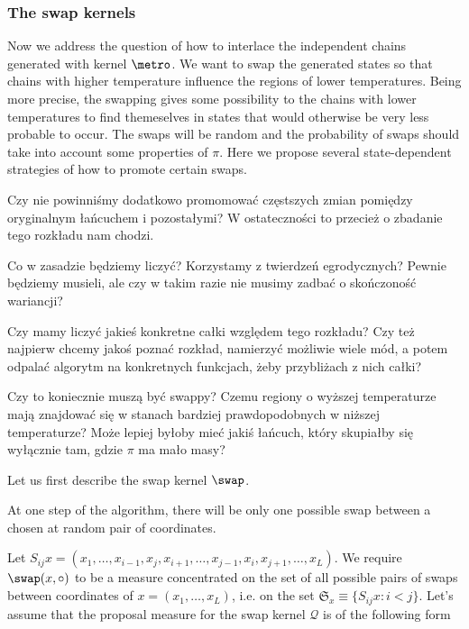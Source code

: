 \subsubsection*{The swap kernels}

	Now we address the question of how to interlace the independent chains generated with kernel $\metro$. We want to swap the generated states so that chains with higher temperature influence the regions of lower temperatures. Being more precise, the swapping gives some possibility to the chains with lower temperatures to find themeselves in states that would otherwise be very less probable to occur. The swaps will be random and the probability of swaps should take into account some properties of $\pi$. Here we propose several state-dependent strategies of how to promote certain swaps.
	
\begin{questions}[resume]
	\item Czy nie powinniśmy dodatkowo promomować częstszych zmian pomiędzy oryginalnym łańcuchem i pozostałymi? W ostateczności to przecież o zbadanie tego rozkładu nam chodzi. 

	\item Co w zasadzie będziemy liczyć? Korzystamy z twierdzeń egrodycznych? Pewnie będziemy musieli, ale czy w takim razie nie musimy zadbać o skończoność wariancji?

	\item Czy mamy liczyć jakieś konkretne całki względem tego rozkładu? Czy też najpierw chcemy jakoś poznać rozkład, namierzyć możliwie wiele mód, a potem odpalać algorytm na konkretnych funkcjach, żeby przybliżach z nich całki?

	\item Czy to koniecznie muszą być swappy? Czemu regiony o wyższej temperaturze mają znajdować się w stanach bardziej prawdopodobnych w niższej temperaturze? Może lepiej byłoby mieć jakiś łańcuch, który skupiałby się wyłącznie tam, gdzie $\pi$ ma mało masy? 
\end{questions}

	Let us first describe the swap kernel $\swap$. 
\begin{assumptions}[resume]
	\item At one step of the algorithm, there will be only one possible swap between a chosen at random pair of coordinates.
\end{assumptions}
	
	Let $S_{ij} x = (x_1, \dots, x_{i-1}, x_j, x_{i+1}, \dots, x_{j-1}, x_i, x_{j+1}, \dots, x_L)$. 
	We require $\swap(x, \circ )$ to be a measure concentrated on the set of all possible pairs of swaps between coordinates of $x = (x_1, \dots, x_L)$, i.e. on the set $\mathfrak{S}_x \equiv \{ S_{ij}x : i < j  \}$. Let's assume that the proposal measure for the swap kernel $\mathcal{Q}$ is of the following form 
	
